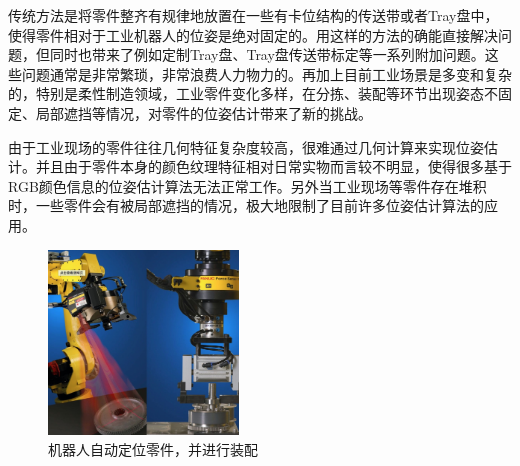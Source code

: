
传统方法是将零件整齐有规律地放置在一些有卡位结构的传送带或者Tray盘中，使得零件相对于工业机器人的位姿是绝对固定的。用这样的方法的确能直接解决问题，但同时也带来了例如定制Tray盘、Tray盘传送带标定等一系列附加问题。这些问题通常是非常繁琐，非常浪费人力物力的。再加上目前工业场景是多变和复杂的，特别是柔性制造领域，工业零件变化多样，在分拣、装配等环节出现姿态不固定、局部遮挡等情况，对零件的位姿估计带来了新的挑战。


由于工业现场的零件往往几何特征复杂度较高，很难通过几何计算来实现位姿估计。并且由于零件本身的颜色纹理特征相对日常实物而言较不明显，使得很多基于RGB颜色信息的位姿估计算法无法正常工作。另外当工业现场等零件存在堆积时，一些零件会有被局部遮挡的情况，极大地限制了目前许多位姿估计算法的应用。


\begin{figure}[htb]
	\centering 
	\includegraphics[width=0.45\textwidth]{./mypic/工业机器人2.jpg} 
	\caption{机器人自动定位零件，并进行装配}
\end{figure}

